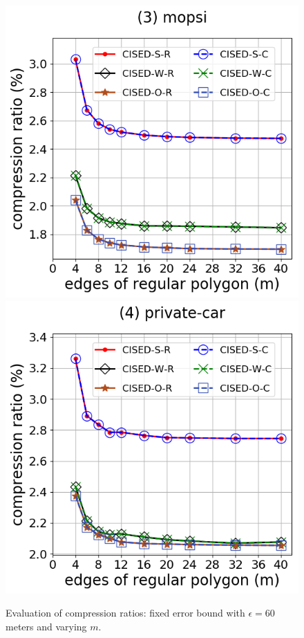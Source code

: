 \begin{figure}[tb!]
\includegraphics[scale = 0.3]{Figures/Exp-M-e-60-CR-mopsi.png}
\includegraphics[scale = 0.3]{Figures/Exp-M-e-60-CR-private.png}
\vspace{-1ex}
\caption{\small Evaluation of compression ratios: fixed error bound with $\epsilon=60$ meters and varying $m$.}
\label{fig:m-cr-e60}
\vspace{-1ex}
\end{figure}


